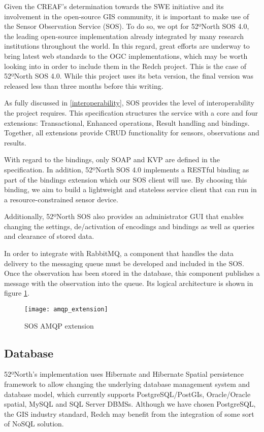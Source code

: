 Given the CREAF's determination towards the SWE initiative and its involvement in  the open-source GIS community, it is important to make use of the Sensor Observation Service (SOS). To do so, we opt for 52ºNorth SOS 4.0, the leading open-source implementation already integrated by many research institutions throughout the world. In this regard, great efforts are underway to bring latest web standards to the OGC implementations, which may be worth looking into in order to include them in the Redch project. This is the case of 52ºNorth SOS 4.0. While this project uses its beta version, the final version was released less than three months before this writing.

As fully discussed in \ref{interoperability}, SOS provides the level of interoperability the project requires. This specification structures the service with a core and four extensions: Transactional, Enhanced operations, Result handling and bindings. Together, all extensions provide CRUD functionality for sensors, observations and results.

With regard to the bindings, only SOAP and KVP are defined in the specification. In addition, 52ºNorth SOS 4.0 implements a RESTful binding as part of the bindings extension which our SOS client will use. By choosing this binding, we aim to build a lightweight and stateless service client that can run in a resource-constrained sensor device.

Additionally, 52ºNorth SOS also provides an administrator GUI that enables changing the settings, de/activation of encodings and bindings as well as queries and clearance of stored data.

In order to integrate with RabbitMQ, a component that handles the data delivery to the messaging queue must be developed and included in the SOS. Once the observation has been stored in the database, this component publishes a message with the observation into the queue. Its logical architecture is shown in figure \ref{fig:amqp_extension}.

\begin{figure}[p]
	\centering
	\texttt{[image: amqp\_extension]}
	\caption{SOS AMQP extension}
	\label{fig:amqp_extension}
\end{figure}

\subsection{Database}

52ºNorth's implementation uses Hibernate and Hibernate Spatial persistence framework to allow changing the underlying database management system and database model, which currently supports PostgreSQL/PostGIs, Oracle/Oracle spatial, MySQL and SQL Server DBMSs. Although we have chosen PostgreSQL, the GIS industry standard, Redch may benefit from the integration of some sort of NoSQL solution.

